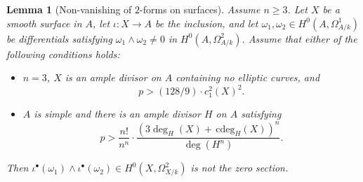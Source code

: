 \documentclass[11pt]{amsart}
\newtheorem{lemma}[theorem]{Lemma}
\theoremstyle{remark}
\numberwithin{equation}{section}
\newcommand{\cdeg}{\,\mathrm{cdeg}}
\begin{document}
\begin{lemma}[Non-vanishing of $2$-forms on surfaces]\label{Lemma2forms} Assume $n\ge 3$. Let $X$ be a smooth surface in $A$, let $\iota:X\to A$ be the inclusion, and let $\omega_1,\omega_2\in H^0(A,\Omega^1_{A/k})$ be differentials satisfying  $\omega_1\wedge\omega_2\ne 0$ in $H^0(A,\Omega^2_{A/k})$. Assume that either of the following conditions holds:
\begin{itemize}
\item[(i)] $n=3$, $X$ is an ample divisor on $A$ containing no elliptic curves,  and 
\begin{equation}\label{Eqn2formi}
p>(128/9)\cdot c_1^2(X)^2.
\end{equation}
\item[(ii)] $A$ is simple and there is an ample divisor $H$ on $A$ satisfying 
\begin{equation}\label{Eqn2formii}
p>\frac{ n!}{n^n}\cdot \frac{(3\deg_H(X)+\cdeg_H(X))^n}{\deg(H^n)}.
\end{equation}
\end{itemize}
Then $\iota^\bullet (\omega_1)\wedge \iota^\bullet(\omega_2)\in H^0(X,\Omega^2_{X/k})$ is not the zero section. 
\end{lemma}
\end{document}
